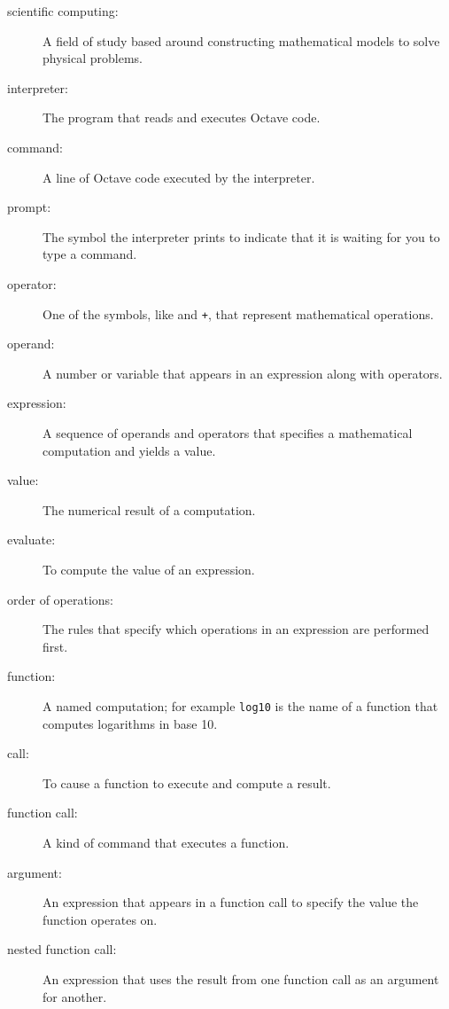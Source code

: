 \begin{description}

\item[scientific computing:] A field of study based around constructing
mathematical models to solve physical problems.

\item[interpreter:] The program that reads and executes Octave code.

\item[command:] A line of Octave code executed by the interpreter.

\item[prompt:] The symbol the interpreter prints to indicate that it is
waiting for you to type a command.

\item[operator:] One of the symbols, like {\tt *} and {\tt +}, that
represent mathematical operations.  

\item[operand:] A number or variable that appears in an expression along
with operators.

\item[expression:] A sequence of operands and operators that specifies
a mathematical computation and yields a value.  

\item[value:] The numerical result of a computation.  

\item[evaluate:] To compute the value of an expression.  

\item[order of operations:] The rules that specify which operations
in an expression are performed first.

\item[function:] A named computation; for example {\tt log10} is the
name of a function that computes logarithms in base 10.

\item[call:] To cause a function to execute and compute a result.  

\item[function call:] A kind of command that executes a function.  

\item[argument:] An expression that appears in a function call to
specify the value the function operates on.

\item[nested function call:] An expression that uses the result from
one function call as an argument for another.  


\end{description}
